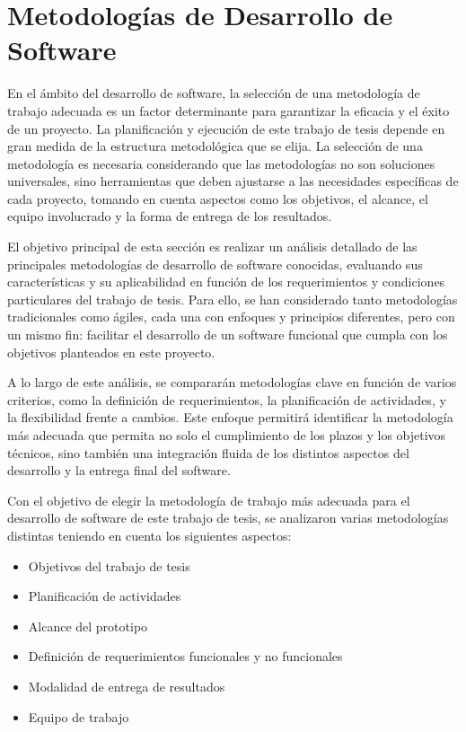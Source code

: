 \chapter{Metodologías de Desarrollo de Software}
\label{cp:software-methodology}

\parindent0pt

En el ámbito del desarrollo de software, la selección de una metodología de trabajo adecuada es un factor determinante para garantizar la eficacia y el éxito de un proyecto. La planificación y ejecución de este trabajo de tesis depende en gran medida de la estructura metodológica que se elija. La selección de una metodología es necesaria considerando que las metodologías no son soluciones universales, sino herramientas que deben ajustarse a las necesidades específicas de cada proyecto, tomando en cuenta aspectos como los objetivos, el alcance, el equipo involucrado y la forma de entrega de los resultados.

El objetivo principal de esta sección es realizar un análisis detallado de las principales metodologías de desarrollo de software conocidas, evaluando sus características y su aplicabilidad en función de los requerimientos y condiciones particulares del trabajo de tesis. Para ello, se han considerado tanto metodologías tradicionales como ágiles, cada una con enfoques y principios diferentes, pero con un mismo fin: facilitar el desarrollo de un software funcional que cumpla con los objetivos planteados en este proyecto.

A lo largo de este análisis, se compararán metodologías clave en función de varios criterios, como la definición de requerimientos, la planificación de actividades, y la flexibilidad frente a cambios. Este enfoque permitirá identificar la metodología más adecuada que permita no solo el cumplimiento de los plazos y los objetivos técnicos, sino también una integración fluida de los distintos aspectos del desarrollo y la entrega final del software.

Con el objetivo de elegir la metodología de trabajo más adecuada para el desarrollo de software de este trabajo de tesis, se analizaron varias metodologías distintas teniendo en cuenta los siguientes aspectos:

\begin{itemize}
    \item Objetivos del trabajo de tesis
    \item Planificación de actividades
    \item Alcance del prototipo
    \item Definición de requerimientos funcionales y no funcionales
    \item Modalidad de entrega de resultados
    \item Equipo de trabajo
\end{itemize}

